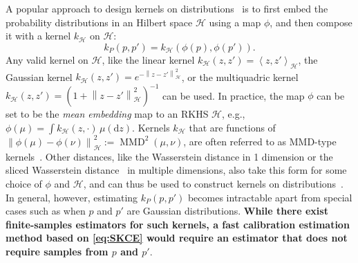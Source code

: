 \documentclass{uai2023} %
\begin{document}
A popular approach to design kernels on distributions~\citep{DBLP:journals/jmlr/SzaboSPG16, DBLP:conf/aistats/0001GPS15} is to first embed the probability distributions in an Hilbert space $\mathcal{H}$ using a map $\phi$, and then compose it with a kernel $k_{\mathcal{H}}$ on $\mathcal{H}$:
\begin{equation*}
k_{P}(p, p') = k_{\mathcal{H}}(\phi(p), \phi(p')).
\end{equation*}
Any valid  kernel on $ \mathcal{H}$, like the linear kernel $k_{\mathcal{H}}(z, z') = \left \langle z, z' \right \rangle_{\mathcal{H}}$, the Gaussian kernel $k_{\mathcal{H}}(z, z') = e^{-\left \|z - z'\right \|^2_{\mathcal{H}}}$, or the multiquadric kernel $k_{\mathcal{H}}(z, z') = (1 + \left \|z - z'\right\|^2_{\mathcal{H}})^{-1}$ can be used.
In practice, the map $\phi$ can be set to be the \emph{mean embedding} map to an RKHS $\mathcal{H}$, e.g., $\phi(\mu) = \int k_{\mathcal{H}}(z, \cdot) \,\mu(\mathrm{d}z)$.
Kernels $k_{\mathcal{H}}$ that are functions of $\left\| \phi(\mu) - \phi(\nu) \right \|^2_{\mathcal{H}} := \operatorname{MMD}^2(\mu, \nu)$, are often referred to as MMD-type kernels~\cite{DBLP:conf/icml/MeunierPC22}.
Other distances, like the Wasserstein distance in 1 dimension or the sliced Wasserstein distance~\citep{DBLP:journals/jmiv/BonneelRPP15} in multiple dimensions, also take this form for some choice of $\phi$ and $\mathcal{H}$, and can thus be used to construct kernels on distributions~\cite{DBLP:conf/icml/MeunierPC22}.
In general, however, estimating $k_{P}(p, p')$ becomes intractable apart from special cases such as when $p$ and $p'$ are Gaussian distributions.
\textbf{While there exist finite-samples estimators for such kernels, a fast calibration estimation method based on \cref{eq:SKCE} would require an estimator that does not require samples from $p$ and $p'$}.


\end{document}
